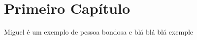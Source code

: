 \documentclass[
	12pt,				%
	openright,			%
	oneside,			%
	a4paper,			%
	english,			%
	french,				%
	spanish,			%
	brazil,sumario=tradicional				%
	]{UFPE-DCP} %
\makeatletter
\newlength\interepigraphskip
\renewcommand\epigraph[3][\interepigraphskip]{\vspace{\beforeepigraphskip}
  {\epigraphsize\begin{\epigraphflush}\begin{minipage}{\epigraphwidth}
    \@epitext{#2}\\[#1] \@episource{#3}
    \end{minipage}\end{\epigraphflush}
    \vspace{\afterepigraphskip}}}
\makeatother
\begin{document}
\lipsum[31]


\lipsum[31]

\lipsum[31]


\lipsum[31]

\lipsum[31]


\lipsum[31]

\lipsum[31]


\lipsum[31]

\lipsum[31]


\lipsum[31]

\lipsum[31]


\lipsum[31]

\lipsum[31]


\lipsum[31]

\lipsum[31]


\lipsum[31]

\lipsum[31]



\chapter{Primeiro Capítulo}




\OnehalfSpacing %
Miguel é um exemplo de pessoa bondosa e blá blá blá exemple \lipsum[2]
\lipsum[31]

\lipsum[31]
\end{document}
